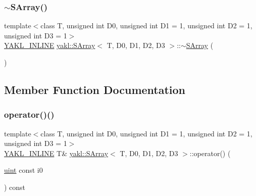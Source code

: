 \subsubsection{\texorpdfstring{$\sim$\+S\+Array()}{~SArray()}}
{\footnotesize\ttfamily template$<$class T, unsigned int D0, unsigned int D1 = 1, unsigned int D2 = 1, unsigned int D3 = 1$>$ \\
\hyperlink{YAKL_8h_aa0dd629ffce6d564b19e9313fb91a5ad}{Y\+A\+K\+L\+\_\+\+I\+N\+L\+I\+NE} \hyperlink{classyakl_1_1SArray}{yakl\+::\+S\+Array}$<$ T, D0, D1, D2, D3 $>$\+::$\sim$\hyperlink{classyakl_1_1SArray}{S\+Array} (\begin{DoxyParamCaption}{ }\end{DoxyParamCaption})\hspace{0.3cm}{\ttfamily [inline]}}



\subsection{Member Function Documentation}
\mbox{\label{classyakl_1_1SArray_a49eae1a54740b7adffe54c0832ab1f21}} 
\subsubsection{\texorpdfstring{operator()()}{operator()()}\hspace{0.1cm}{\footnotesize\ttfamily [1/4]}}
{\footnotesize\ttfamily template$<$class T, unsigned int D0, unsigned int D1 = 1, unsigned int D2 = 1, unsigned int D3 = 1$>$ \\
\hyperlink{YAKL_8h_aa0dd629ffce6d564b19e9313fb91a5ad}{Y\+A\+K\+L\+\_\+\+I\+N\+L\+I\+NE} T\& \hyperlink{classyakl_1_1SArray}{yakl\+::\+S\+Array}$<$ T, D0, D1, D2, D3 $>$\+::operator() (\begin{DoxyParamCaption}\item[{\hyperlink{classyakl_1_1SArray_a777ad93441c16e786309b27e40bc56f0}{uint} const}]{i0 }\end{DoxyParamCaption}) const\hspace{0.3cm}{\ttfamily [inline]}}

\mbox{\label{classyakl_1_1SArray_a1d4b5858b6c36e636cb4abf26deefa92}} 
